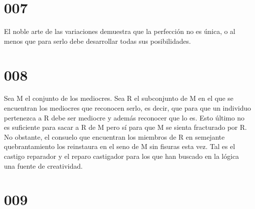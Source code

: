 \documentclass[a4paper,11pt,openright,twocolumn]{book}
\begin{document}
\section*{007}

El noble arte de las variaciones demuestra que la perfección no es única, o al menos que para serlo debe desarrollar todas
sus posibilidades.

\section*{008}

Sea M el conjunto de los mediocres. Sea R el subconjunto de M en el que se encuentran los mediocres que reconocen serlo, es 
decir, que para que un individuo pertenezca a R debe ser mediocre y además reconocer que lo es. Esto último no es suficiente para sacar a R de M pero sí para que M se sienta fracturado por R. No obstante, el consuelo que encuentran los miembros de R en semejante quebrantamiento los reinstaura en el seno de M sin fisuras esta vez. Tal es el castigo reparador y el reparo castigador para los que han buscado en la lógica una fuente de creatividad.

\section*{009}
\end{document}
